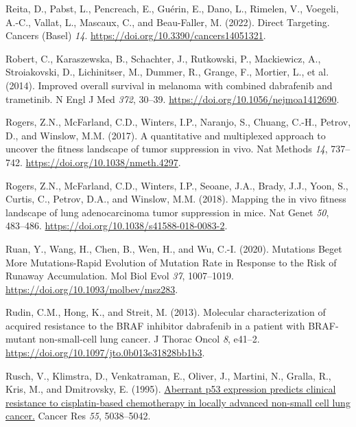 \begin{CSLReferences}{0}{0}
\leavevmode{}%
Reita, D., Pabst, L., Pencreach, E., Guérin, E., Dano, L., Rimelen, V., Voegeli, A.-C., Vallat, L., Mascaux, C., and Beau-Faller, M. (2022). Direct Targeting. Cancers (Basel) \emph{14}. \url{https://doi.org/10.3390/cancers14051321}.

\leavevmode{}%
Robert, C., Karaszewska, B., Schachter, J., Rutkowski, P., Mackiewicz, A., Stroiakovski, D., Lichinitser, M., Dummer, R., Grange, F., Mortier, L., et al. (2014). Improved overall survival in melanoma with combined dabrafenib and trametinib. N Engl J Med \emph{372}, 30--39. \url{https://doi.org/10.1056/nejmoa1412690}.

\leavevmode{}%
Rogers, Z.N., McFarland, C.D., Winters, I.P., Naranjo, S., Chuang, C.-H., Petrov, D., and Winslow, M.M. (2017). A quantitative and multiplexed approach to uncover the fitness landscape of tumor suppression in vivo. Nat Methods \emph{14}, 737--742. \url{https://doi.org/10.1038/nmeth.4297}.

\leavevmode{}%
Rogers, Z.N., McFarland, C.D., Winters, I.P., Seoane, J.A., Brady, J.J., Yoon, S., Curtis, C., Petrov, D.A., and Winslow, M.M. (2018). Mapping the in vivo fitness landscape of lung adenocarcinoma tumor suppression in mice. Nat Genet \emph{50}, 483--486. \url{https://doi.org/10.1038/s41588-018-0083-2}.

\leavevmode{}%
Ruan, Y., Wang, H., Chen, B., Wen, H., and Wu, C.-I. (2020). Mutations Beget More Mutations-Rapid Evolution of Mutation Rate in Response to the Risk of Runaway Accumulation. Mol Biol Evol \emph{37}, 1007--1019. \url{https://doi.org/10.1093/molbev/msz283}.

\leavevmode{}%
Rudin, C.M., Hong, K., and Streit, M. (2013). Molecular characterization of acquired resistance to the BRAF inhibitor dabrafenib in a patient with BRAF-mutant non-small-cell lung cancer. J Thorac Oncol \emph{8}, e41--2. \url{https://doi.org/10.1097/jto.0b013e31828bb1b3}.

\leavevmode{}%
Rusch, V., Klimstra, D., Venkatraman, E., Oliver, J., Martini, N., Gralla, R., Kris, M., and Dmitrovsky, E. (1995). \href{https://www.ncbi.nlm.nih.gov/pubmed/7585548}{Aberrant p53 expression predicts clinical resistance to cisplatin-based chemotherapy in locally advanced non-small cell lung cancer.} Cancer Res \emph{55}, 5038--5042.


\end{CSLReferences}
